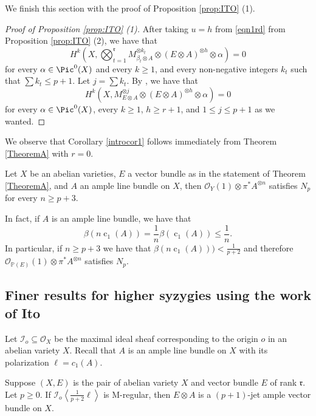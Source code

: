 \documentclass[11pt,letter]{amsart}
\numberwithin{equation}{section}
\begin{document}
We finish this section with the proof of Proposition \ref{prop:ITO} (1).


   \begin{proof}[Proof of Proposition \ref{prop:ITO} (1)]  
   After taking $u=h$ from \eqref{eqn1rd} from Proposition \ref{prop:ITO} (2), we have that 
   \[H^k\left(X,\bigotimes_{t=1}^\mathfrak{r} M_{\beta_t\otimes A}^{\otimes k_t}\otimes (E\otimes A)^{\otimes h} \otimes\alpha\right)=0\] for every $\alpha\in\Pic^0(X)$ and every $k\ge 1$, and every non-negative integers $k_t$ such that $\sum k_t\leq p+1$. Let $j=\sum k_t$. By \cite[Lemma 4.4]{Chi19}, we have that 
   \[H^k\left(X,M_{E\otimes A}^{\otimes j}\otimes (E\otimes A)^{\otimes h} \otimes\alpha\right)=0\] for every $\alpha\in\Pic^0(X)$, every $k\ge 1$, $h\geq r+1$, and $1\leq j\leq p+1$ as we wanted.
   \end{proof}
   
   
     We observe that Corollary \ref{introcor1} follows immediately from Theorem \ref{TheoremA} with $r=0$.
     
     
   \begin{cor}\label{introcor1}
    Let $X$ be an abelian varieties, $E$ a vector bundle as in the statement of Theorem \ref{TheoremA}, and $A$ an ample line bundle on $X$, then $\mathcal{O}_Y(1)\otimes\pi^* A^{\otimes n}$ satisfies $N_p$ for every $n\geq p+3$.
  \end{cor}
  
  In fact, if $A$ is an ample line bundle, we have that 
   $$\beta(n\operatorname{c}_1(A))=\frac{1}{n}\beta(\operatorname{c}_1(A))\leq \frac{1}{n}.$$
In particular, if $n\geq p+3$ we have that $\beta(n\operatorname{c}_1(A)))<\frac{1}{p+2}$ and therefore $\mathcal{O}_{\mathbb{P}(E)}(1)\otimes\pi^*A^{\otimes n}$ satisfies $N_p$.





\subsection{Finer results for higher syzygies using the work of Ito}
Let $\mathcal{I}_o\subseteq\mathcal{O}_X$ be the maximal ideal sheaf corresponding to the origin $o$ in an abelian variety $X$. 
Recall that $A$ is an ample line bundle on $X$ with its polarization $\ell=c_1(A)$. 


\begin{prop}\label{prop5.1}
Suppose $(X,E)$ is the pair of abelian variety $X$ and vector bundle $E$ of rank $\mathfrak{r}$. Let $p\geq 0$.
If
$
\mathcal{I}_o\left\langle \frac{1}{p+2}\ell\right\rangle
$ is M-regular,
 then $E\otimes A$ is a $(p+1)$-jet ample vector bundle on $X$. 
\end{prop}
\end{document}
